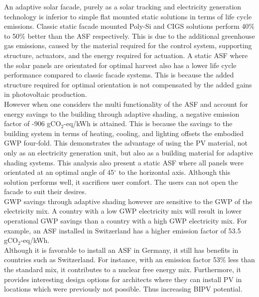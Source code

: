 
An adaptive solar facade, purely as a solar tracking and electricity generation technology is inferior to simple flat mounted static solutions in terms of life cycle emissions.  Classic static facade mounted Poly-Si and CIGS solutions perform 40\% to 50\% better than the ASF respectively. This is due to the additional greenhouse gas emissions, caused by the material required for the control system, supporting structure, actuators, and the energy required for actuation. A static ASF where the solar panels are orientated for optimal harvest also has a lower life cycle performance compared to classic facade systems. This is because the added structure required for optimal orientation is not compensated by the added gains in photovoltaic production.\\

However when one considers the multi functionality of the ASF and account for energy savings to the building through adaptive shading, a negative emission factor of  -906 gCO$_{2}$-eq/kWh is attained. This is because the savings to the building system in terms of heating, cooling, and lighting offsets the embodied GWP four-fold. This demonstrates the advantage of using the PV material, not only as an electricity generation unit, but also as a building material for adaptive shading systems. This analysis also present a static ASF where all panels were orientated at an optimal angle of 45$^{\circ}$ to the horizontal axis. Although this solution performs well, it sacrifices user comfort. The users can not open the facade to suit their desires.\\



GWP savings through adaptive shading however are sensitive to the GWP of the electricity mix. A country with a low GWP electricity mix will result in lower operational GWP savings than a country with a high GWP electricity mix. For example, an ASF installed in Switzerland has a higher emission factor of 53.5 gCO$_{2}$-eq/kWh.\\

Although it is favorable to install an ASF in Germany, it still has benefits in countries such as Switzerland. For instance, with an emission factor 53\% less than the standard mix, it contributes to a nuclear free energy mix. Furthermore, it provides interesting design options for architects where they can install PV in locations which were previously not possible. Thus increasing BIPV potential.\\

